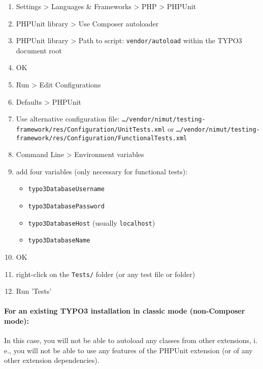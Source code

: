 \documentclass[a4paper,11pt,headsepline]{scrartcl}
\begin{document}
\begin{enumerate}
  \item Settings > Languages \& Frameworks > PHP > PHPUnit
  \item PHPUnit library > Use Composer autoloader
  \item PHPUnit library > Path to script: \texttt{vendor/autoload} within the TYPO3 document root
  \item OK
  \item Run > Edit Configurations
  \item Defaults > PHPUnit
  \item Use alternative configuration file: \texttt{…/vendor/nimut/testing-framework/res/Configuration/UnitTests.xml} or \texttt{…/vendor/nimut/testing-framework/res/Configuration/FunctionalTests.xml}
  \item Command Line > Environment variables
  \item add four variables (only necessary for functional tests):
    \begin{itemize}
      \item \texttt{typo3DatabaseUsername}
      \item \texttt{typo3DatabasePassword}
      \item \texttt{typo3DatabaseHost} (usually \texttt{localhost})
      \item \texttt{typo3DatabaseName}
    \end{itemize}
  \item OK
  \item right-click on the \texttt{Tests/} folder (or any test file or folder)
  \item Run 'Tests'
\end{enumerate}


\paragraph{For an existing TYPO3 installation in classic mode (non-Composer mode):}

In this case, you will not be able to autoload any classes from other extensions, i.\,e., you will not be able to use any features of the PHPUnit extension (or of any other extension dependencies).
\end{document}

